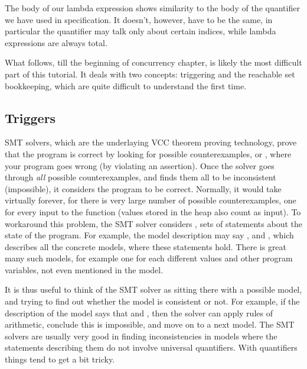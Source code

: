 \begin{note}
The body of our lambda expression shows similarity to the body
of the quantifier we have used in specification.
It doesn't, however, have to be the same, in particular the quantifier
may talk only about certain indices, while lambda expressions
are always total.
\end{note}

\begin{note}
What follows, till the beginning of concurrency chapter, is likely the most difficult part of this tutorial.
It deals with two concepts: triggering and the reachable set
bookkeeping, which are quite difficult to understand the first time.
\end{note}

\subsection{Triggers}

SMT solvers, which are the underlaying VCC theorem proving technology,
prove that the program is correct by looking for possible counterexamples,
or , where your program goes wrong (\eg by violating an assertion).
Once the solver goes through \emph{all} possible counterexamples, and finds them
all to be inconsistent (\ie impossible),
it considers the program to be correct.
Normally, it would take virtually forever, for there is very large number of
possible counterexamples, one for every input to the function (values stored in
the heap also count as input).
To workaround this problem, the SMT solver considers
, \ie 
sets of statements about the state of the program.
For example, the model description may say , 
and , which describes all the concrete models, where
these statements hold. There is great many such models,
for example one for each different values  and other program variables,
not even mentioned in the model.

It is thus useful to think of the SMT solver as sitting there with
a possible model, and trying to find out whether the model is consistent or not.
For example, if the description of the model says that  and
, then the solver can apply rules of arithmetic, conclude this is
impossible, and move on to a next model.
The SMT solvers are usually very good in finding inconsistencies in models
where the statements describing them do not involve universal quantifiers.
With quantifiers things tend to get a bit tricky.

